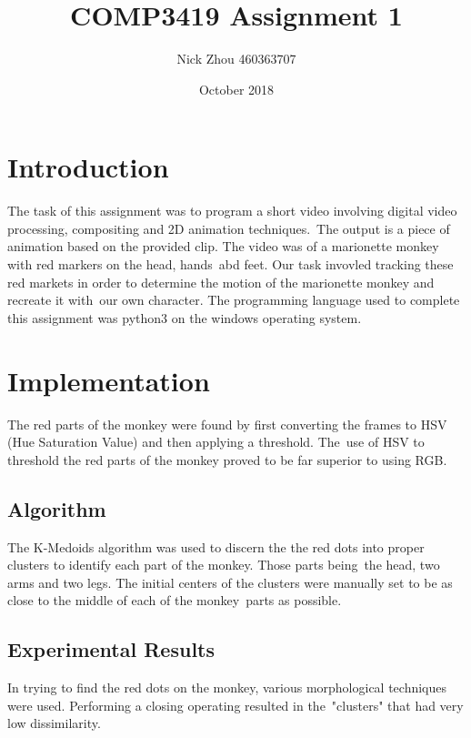 \documentclass[12pt,a4paper]{article}
\begin{document}
    \begin{titlepage}
        \title{COMP3419 Assignment 1}
        \author{Nick Zhou 460363707}
        \date{October 2018}
        \maketitle
    \end{titlepage}

    \begin{tableofcontents}
        \tableofcontents
        \pagebreak
    \end{tableofcontents}

    \section{Introduction}
    The task of this assignment was to program a short video involving digital video processing, compositing and 2D animation techniques.\
    The output is a piece of animation based on the provided clip. The video was of a marionette monkey with red markers on the head, hands\
    abd feet. Our task invovled tracking these red markets in order to determine the motion of the marionette monkey and recreate it with\
    our own character.
    The programming language used to complete this assignment was python3 on the windows operating system.

    \section{Implementation}
    The red parts of the monkey were found by first converting the frames to HSV (Hue Saturation Value) and then applying a threshold. The\
    use of HSV to threshold the red parts of the monkey proved to be far superior to using RGB.

      \subsection{Algorithm}
      The K-Medoids algorithm was used to discern the the red dots into proper clusters to identify each part of the monkey. Those parts being\
      the head, two arms and two legs. The initial centers of the clusters were manually set to be as close to the middle of each of the monkey\
      parts as possible.

      \subsection{Experimental Results}
      In trying to find the red dots on the monkey, various morphological techniques were used. Performing a closing operating resulted in the\
      "clusters" that had very low dissimilarity.
\end{document}
